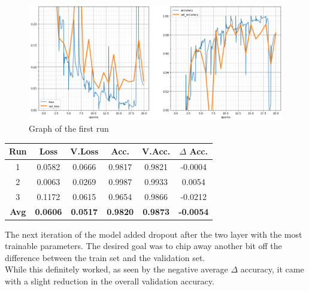 \begin{figure}[H]
	\begin{center}
	\includegraphics[width=\linewidth]{Immagini/conv-drop-pool-1}
	\caption{Graph of the first run}
	\end{center}
\end{figure}
\begin{table}[H]
	\centering
	\begin{tabular}{cccccc}
		\textbf{Run} &\textbf{Loss}&\textbf{V.Loss} &\textbf{Acc.}&\textbf{V.Acc.}&\textbf{$\Delta$ Acc.} \\ \hline
		1   & 0.0582    & 0.0666    & 0.9817    & 0.9821    & -0.0004\\
		2   & 0.0063    & 0.0269    & 0.9987    & 0.9933    & 0.0054\\
		3   & 0.1172    & 0.0615    & 0.9654    & 0.9866    & -0.0212\\
		\textbf{Avg} & \textbf{0.0606}    & \textbf{0.0517}    & \textbf{0.9820}    & \textbf{0.9873}    & \textbf{-0.0054}
	\end{tabular}
\end{table}

The next iteration of the model added dropout after the two layer with the most trainable parameters. The desired goal was to chip away another bit off the difference between the train set and the validation set.\\
While this definitely worked, as seen by the negative average $\Delta$ accuracy, it came with a slight reduction in the overall validation accuracy.